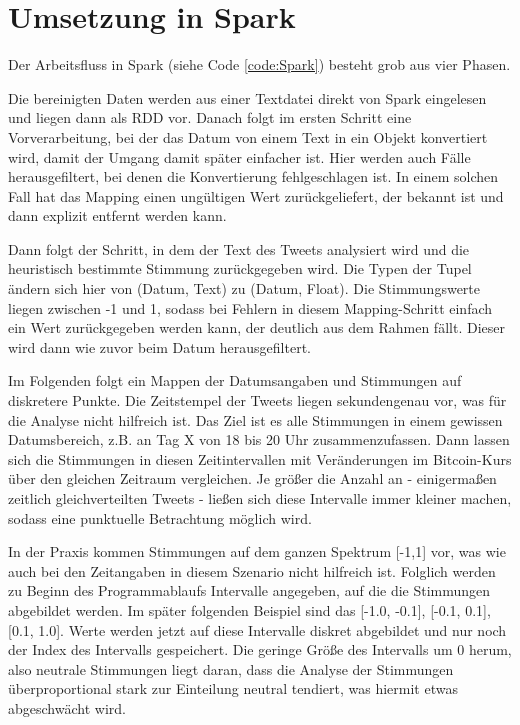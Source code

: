 \section{Umsetzung in Spark}
Der Arbeitsfluss in Spark (siehe Code \ref{code:Spark}) besteht grob aus vier Phasen. 

Die bereinigten Daten werden aus einer Textdatei direkt von Spark eingelesen und liegen dann als RDD vor. Danach folgt im ersten Schritt eine Vorverarbeitung, bei der das Datum von einem Text in ein Objekt konvertiert wird, damit der Umgang damit sp\"ater einfacher ist. Hier werden auch F\"alle herausgefiltert, bei denen die Konvertierung fehlgeschlagen ist. In einem solchen Fall hat das Mapping einen ung\"ultigen Wert zur\"uckgeliefert, der bekannt ist und dann explizit entfernt werden kann.

Dann folgt der Schritt, in dem der Text des Tweets analysiert wird und die heuristisch bestimmte Stimmung zur\"uckgegeben wird. Die Typen der Tupel \"andern sich hier von (Datum, Text) zu (Datum, Float). Die Stimmungswerte liegen zwischen -1 und 1, sodass bei Fehlern in diesem Mapping-Schritt einfach ein Wert zur\"uckgegeben werden kann, der deutlich aus dem Rahmen f\"allt. Dieser wird dann wie zuvor beim Datum herausgefiltert.

Im Folgenden folgt ein Mappen der Datumsangaben und Stimmungen auf diskretere Punkte. Die Zeitstempel der Tweets liegen sekundengenau vor, was f\"ur die Analyse nicht hilfreich ist. Das Ziel ist es alle Stimmungen in einem gewissen Datumsbereich, z.B. an Tag X von 18 bis 20 Uhr zusammenzufassen. Dann lassen sich die Stimmungen in diesen Zeitintervallen mit Ver\"anderungen im Bitcoin-Kurs \"uber den gleichen Zeitraum vergleichen. Je gr\"o{\ss}er die Anzahl an - einigerma{\ss}en zeitlich gleichverteilten Tweets - lie{\ss}en sich diese Intervalle immer kleiner machen, sodass eine punktuelle Betrachtung m\"oglich wird.

In der Praxis kommen Stimmungen auf dem ganzen Spektrum [-1,1] vor, was wie auch bei den Zeitangaben in diesem Szenario nicht hilfreich ist. Folglich werden zu Beginn des Programmablaufs Intervalle angegeben, auf die die Stimmungen abgebildet werden. Im sp\"ater folgenden Beispiel sind das [-1.0, -0.1], [-0.1, 0.1], [0.1, 1.0]. Werte werden jetzt auf diese Intervalle diskret abgebildet und nur noch der Index des Intervalls gespeichert. Die geringe Gr\"o{\ss}e des Intervalls um 0 herum, also neutrale Stimmungen liegt daran, dass die Analyse der Stimmungen \"uberproportional stark zur Einteilung neutral tendiert, was hiermit etwas abgeschw\"acht wird.

